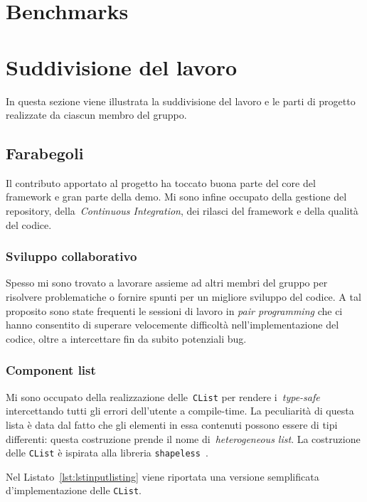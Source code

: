 \section{Benchmarks}\label{sec:benchmarks}

\section{Suddivisione del lavoro}\label{sec:suddivisione-del-lavoro}
In questa sezione viene illustrata la suddivisione del lavoro e le parti di progetto realizzate da ciascun membro del
gruppo.

\subsection{Farabegoli}\label{subsec:farabegoli}
Il contributo apportato al progetto ha toccato buona parte del core del framework e gran parte della demo.
Mi sono infine occupato della gestione del repository, della~\textit{Continuous Integration}, dei rilasci del framework
e della qualità del codice.

\subsubsection{Sviluppo collaborativo}
Spesso mi sono trovato a lavorare assieme ad altri membri del gruppo per risolvere problematiche o fornire spunti per
un migliore sviluppo del codice.
A tal proposito sono state frequenti le sessioni di lavoro in \textit{pair programming} che ci hanno consentito di superare
velocemente difficoltà nell'implementazione del codice, oltre a intercettare fin da subito potenziali bug.

\subsubsection{Component list}
Mi sono occupato della realizzazione delle~\texttt{CList} per rendere i~\System \textit{type-safe} intercettando tutti
gli errori dell'utente a compile-time.
La peculiarità di questa lista è data dal fatto che gli elementi in essa contenuti possono essere di tipi differenti: questa
costruzione prende il nome di~\textit{heterogeneous list}.
La costruzione delle \texttt{CList} è ispirata alla libreria \texttt{shapeless}~\cite{shapeless}.

Nel Listato~\ref{lst:lstinputlisting} viene riportata una versione semplificata d'implementazione delle \texttt{CList}.


